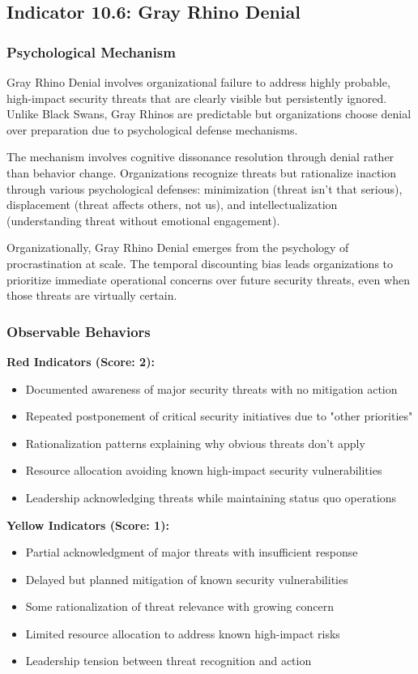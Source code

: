 \documentclass[11pt,a4paper]{article}
\begin{document}
\subsection{Indicator 10.6: Gray Rhino Denial}

\subsubsection{Psychological Mechanism}

Gray Rhino Denial involves organizational failure to address highly probable, high-impact security threats that are clearly visible but persistently ignored. Unlike Black Swans, Gray Rhinos\cite{wucker2016} are predictable but organizations choose denial over preparation due to psychological defense mechanisms.

The mechanism involves cognitive dissonance resolution through denial rather than behavior change. Organizations recognize threats but rationalize inaction through various psychological defenses: minimization (threat isn't that serious), displacement (threat affects others, not us), and intellectualization (understanding threat without emotional engagement).

Organizationally, Gray Rhino Denial emerges from the psychology of procrastination at scale. The temporal discounting bias\cite{frederick2002} leads organizations to prioritize immediate operational concerns over future security threats, even when those threats are virtually certain.

\subsubsection{Observable Behaviors}

\textbf{Red Indicators (Score: 2):}
\begin{itemize}
\item Documented awareness of major security threats with no mitigation action
\item Repeated postponement of critical security initiatives due to "other priorities"
\item Rationalization patterns explaining why obvious threats don't apply
\item Resource allocation avoiding known high-impact security vulnerabilities
\item Leadership acknowledging threats while maintaining status quo operations
\end{itemize}

\textbf{Yellow Indicators (Score: 1):}
\begin{itemize}
\item Partial acknowledgment of major threats with insufficient response
\item Delayed but planned mitigation of known security vulnerabilities
\item Some rationalization of threat relevance with growing concern
\item Limited resource allocation to address known high-impact risks
\item Leadership tension between threat recognition and action
\end{itemize}
\end{document}
